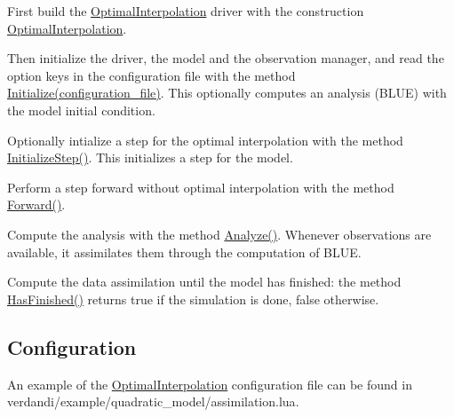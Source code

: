 \documentclass{tufte-book}
\begin{document}
\begin{DoxyEnumerate}
\item \-First build the {\ttfamily  \hyperlink{class_verdandi_1_1_optimal_interpolation}{\-Optimal\-Interpolation}} driver with the construction {\ttfamily  \hyperlink{class_verdandi_1_1_optimal_interpolation_a1cc8e69bfd77788c3601487e0b270bb4}{\-Optimal\-Interpolation}}.


\item \-Then initialize the driver, the model and the observation manager, and read the option keys in the configuration file with the method {\ttfamily  \hyperlink{class_verdandi_1_1_optimal_interpolation_a0007eb5163d6b5b38c85ac40dce0f6ce}{\-Initialize(configuration\-\_\-file)}}. \-This optionally computes an analysis (\-B\-L\-U\-E) with the model initial condition.


\item \-Optionally intialize a step for the optimal interpolation with the method {\ttfamily  \hyperlink{class_verdandi_1_1_optimal_interpolation_a69867908e79e4eb34d092b1a9a49ed1a}{\-Initialize\-Step()}}. \-This initializes a step for the model.


\item \-Perform a step forward without optimal interpolation with the method {\ttfamily  \hyperlink{class_verdandi_1_1_optimal_interpolation_a4c7807e4a2e9b91d4c254e330feb0b72}{\-Forward()}}.


\item \-Compute the analysis with the method {\ttfamily  \hyperlink{class_verdandi_1_1_optimal_interpolation_a77df6f22721e423eb605056b700611fe}{\-Analyze()}}. \-Whenever observations are available, it assimilates them through the computation of \-B\-L\-U\-E.


\item \-Compute the data assimilation until the model has finished\-: the method {\ttfamily  \hyperlink{class_verdandi_1_1_optimal_interpolation_a073bc3510ad2e0a7fe3dc022650bada2}{\-Has\-Finished()}} returns true if the simulation is done, false otherwise.
\end{DoxyEnumerate}


\hypertarget{optimal_interpolation_configuration}{}\subsection{\-Configuration}\label{optimal_interpolation_configuration}

 An example of the {\ttfamily  \hyperlink{class_verdandi_1_1_optimal_interpolation}{\-Optimal\-Interpolation}} configuration file can be found in  {\ttfamily verdandi/example/quadratic\_model/assimilation.lua}.
\end{document}
